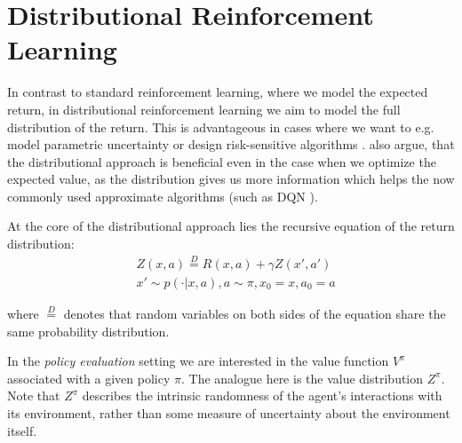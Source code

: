 

\section{Distributional Reinforcement Learning}\label{sec:distrl}

In contrast to standard reinforcement learning, where we model the expected return, in distributional reinforcement learning \cite{many} we aim to model the full distribution of the return. This is advantageous in cases where we want to e.g. model parametric uncertainty \cite{...} or design risk-sensitive algorithms \citep{morimura2012parametric}\citep{morimura2010nonparametric}. \citet{bellemare2017distributional} also argue, that the distributional approach is beneficial even in the case when we optimize the expected value, as the distribution gives us more information which helps the now commonly used approximate algorithms (such as DQN \citep{mnih2015human}).

At the core of the distributional approach lies the recursive equation of the return distribution:
\begin{equation}
\begin{split}
&Z(x, a) \overset{D}{=} R(x, a) + \gamma Z(x', a')\\
&x' \sim p(\cdot|x, a), a \sim \pi, x_0 = x, a_0 = a
\end{split}
\end{equation}

where $\overset{D}{=}$ denotes that random variables on both sides of the equation share the same probability distribution.

In the \emph{policy evaluation} setting \citep{sutton1998reinforcement} we are interested in the value function $V^\pi$ associated with a given policy $\pi$. The analogue here is the value distribution $Z^\pi$. Note that $Z^\pi$ describes the intrinsic randomness of the agent's interactions with its environment, rather than some measure of uncertainty about the environment itself.
%

